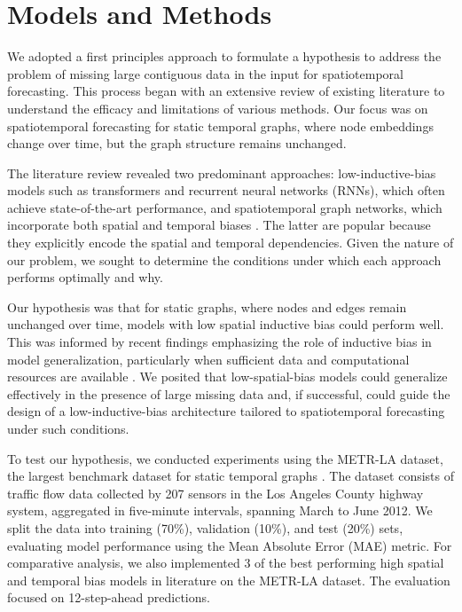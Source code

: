 \documentclass{article}
\theoremstyle{plain}
\theoremstyle{definition}
\theoremstyle{remark}
\begin{document}
\section{Models and Methods}

We adopted a first principles approach to formulate a hypothesis to address the problem of missing large contiguous data in the input for spatiotemporal forecasting. This process began with an extensive review of existing literature to understand the efficacy and limitations of various methods. Our focus was on spatiotemporal forecasting for static temporal graphs, where node embeddings change over time, but the graph structure remains unchanged.

The literature review revealed two predominant approaches: low-inductive-bias models such as transformers and recurrent neural networks (RNNs), which often achieve state-of-the-art performance, and spatiotemporal graph networks, which incorporate both spatial and temporal biases \cite{longa2023graph}. The latter are popular because they explicitly encode the spatial and temporal dependencies. Given the nature of our problem, we sought to determine the conditions under which each approach performs optimally and why.

Our hypothesis was that for static graphs, where nodes and edges remain unchanged over time, models with low spatial inductive bias could perform well. This was informed by recent findings emphasizing the role of inductive bias in model generalization, particularly when sufficient data and computational resources are available \cite{bachmann2024scaling}. We posited that low-spatial-bias models could generalize effectively in the presence of large missing data and, if successful, could guide the design of a low-inductive-bias architecture tailored to spatiotemporal forecasting under such conditions.

To test our hypothesis, we conducted experiments using the METR-LA dataset, the largest benchmark dataset for static temporal graphs \cite{li2017diffusion}. The dataset consists of traffic flow data collected by 207 sensors in the Los Angeles County highway system, aggregated in five-minute intervals, spanning March to June 2012. We split the data into training (70\%), validation (10\%), and test (20\%) sets, evaluating model performance using the Mean Absolute Error (MAE) metric. For comparative analysis, we also implemented 3 of the best performing high spatial and temporal bias models in literature on the METR-LA dataset. The evaluation focused on 12-step-ahead predictions.
\end{document}
